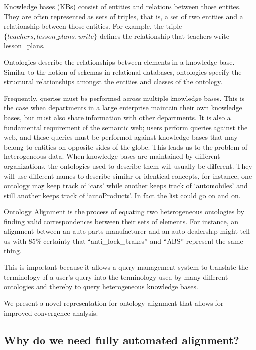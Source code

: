 \documentclass[letterpaper,twocolumn,12pt]{article}
\begin{document}
Knowledge bases (KBs) consist of entities and
relations between those entites. They are often represented as sets of
triples, that is, a set of two entities and a relationship between those
entities. For example, the triple ${\{teachers, lesson\_plans, write\}}$
defines the relationship that teachers write lesson\_plans.

Ontologies describe the relationships between elements in a knowledge base.
Similar to the notion of schemas in relational databases, ontologies specify
the structural relationships amongst the entities and classes of the ontology.

Frequently, queries must be performed across multiple knowledge bases. This is the
case when departments in a large enterprise maintain their own knowledge bases,
but must also share information with other departments. It is also a fundamental
requirement of the semantic web; users perform queries against the web,
and those queries must be performed against knowledge bases that may belong to 
entities on opposite sides of the globe. This leads us to the problem of heterogeneous
data. When knowledge bases are maintained by different organizations, the ontologies
used to describe them will usually be different. They will use different names
to describe similar or identical concepts, for instance, one ontology may keep track
of `cars' while another keeps track of `automobiles' and still another keeps track of 
`autoProducts'. In fact the list could go on and on.

Ontology Alignment is the process of equating two heterogeneous ontologies by
finding valid correspondences between their sets of elements. 
%
For instance, an alignment between an auto parts manufacturer and an auto dealership
might tell us with 85\% certainty that ``anti\_lock\_brakes'' and ``ABS'' represent
the same thing.

This is important because it allows a query management system to translate the terminology
of a user's query into the terminology used by many different ontologies and thereby
to query heterogeneous knowledge bases.

We present a novel representation for ontology alignment that allows for improved
convergence analysis.

\subsection{Why do we need fully automated alignment?}
\end{document}
